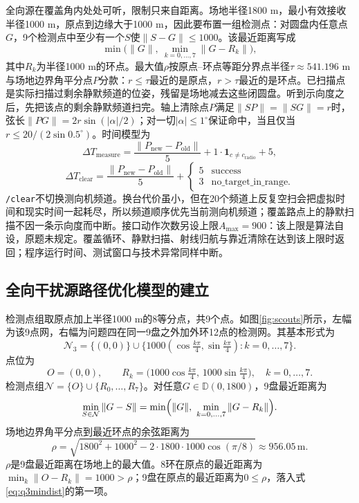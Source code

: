 \documentclass{cumcmthesis}
\begin{document}
全向源在覆盖角内处处可听，限制只来自距离。场地半径1800 m，最小有效接收半径1000 m，原点到边缘大于1000 m，因此要布置一组检测点：对圆盘内任意点$G$，9个检测点中至少有一个$S$使$\|S-G\|\le 1000$。该最近距离写成
\[
\min\bigl(\|G\|,\ \min_{k=0,\ldots,7}\|G-R_k\|\bigr),
\]
其中$R_k$为半径1000 m的环点。最大值$\rho$按原点--环点等距分界点半径$\tau\approx 541.196$ m与场地边界角平分点$P$分款：$r\le\tau$最近的是原点，$r>\tau$最近的是环点。已扫描点是实际扫描过剩余静默频道的位姿，残留是场地减去这些闭圆盘。听到示向度之后，先把该点的剩余静默频道扫完。轴上清除点$P$满足$\|SP\|=\|SG\|=r$时，弦长$\|PG\|=2r\sin(|\alpha|/2)$；对一切$|\alpha|\le 1^\circ$保证命中，当且仅当$r\le 20/(2\sin 0.5^\circ)$。时间模型为
\begin{equation}
\Delta T_{\mathrm{measure}}=\frac{\|P_{\mathrm{new}}-P_{\mathrm{old}}\|}{5}+1\cdot\mathbf{1}_{c\neq c_{\mathrm{radio}}}+5,
\label{eq:tmeas}
\end{equation}
\begin{equation}
\Delta T_{\mathrm{clear}}=\frac{\|P_{\mathrm{new}}-P_{\mathrm{old}}\|}{5}+\begin{cases}5 & \text{success}\\ 3 & \text{no\_target\_in\_range.}\end{cases}
\label{eq:tclr}
\end{equation}
\texttt{/clear}不切换测向机频道。换台代价虽小，但在20个频道上反复空扫会把虚拟时间和现实时间一起耗尽，所以频道顺序优先当前测向机频道；覆盖路点上的静默扫描不因一条示向度而中断。接口动作次数另设上限$A_{\max}=900$：该上限是算法自设，原题未规定。覆盖循环、静默扫描、射线归航与靠近清除在达到该上限时返回；程序运行时间、测试窗口与技术异常同样中断。

\subsection{全向干扰源路径优化模型的建立}

检测点组取原点加上半径1000 m的8等分点，共9个点。如图\ref{fig:scouts}所示，左幅为该9点网，右幅为问题四在同一9盘之外加外环12点的检测网。其基本形式为
\[
\mathcal{N}_3=\bigl\{(0,0)\bigr\}\cup\bigl\{1000(\cos\tfrac{k\pi}{4},\sin\tfrac{k\pi}{4}):k=0,\ldots,7\bigr\}.
\]
点位为
\begin{equation}
O=(0,0),\qquad
R_k=\bigl(1000\cos\tfrac{k\pi}{4},\,1000\sin\tfrac{k\pi}{4}\bigr),\quad k=0,\ldots,7.
\label{eq:q3net}
\end{equation}
检测点组$\mathcal{N}=\{O\}\cup\{R_0,\ldots,R_7\}$。对任意$G\in\mathbb{D}(0,1800)$，9盘最近距离为
\begin{equation}
\min_{S\in\mathcal{N}}\|G-S\|=\min\Bigl(\|G\|,\ \min_{k=0,\ldots,7}\|G-R_k\|\Bigr).
\label{eq:q3mindist}
\end{equation}
场地边界角平分点到最近环点的余弦距离为
\begin{equation}
\rho=\sqrt{1800^2+1000^2-2\cdot 1800\cdot 1000\cos(\pi/8)}\approx 956.05\,\mathrm{m}.
\label{eq:q3rho}
\end{equation}
$\rho$是9盘最近距离在场地上的最大值。8环在原点的最近距离为$\min_k\|O-R_k\|=1000>\rho$；9盘在原点的最近距离为$0\le\rho$，落入式\eqref{eq:q3mindist}的第一项。
\end{document}
